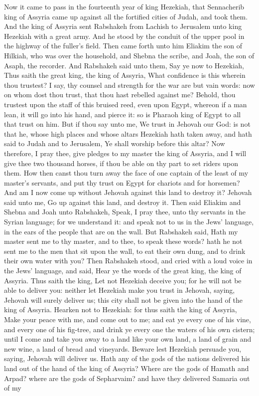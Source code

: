 Now it came to pass in the fourteenth year of king Hezekiah, that Sennacherib king of Assyria came up against all the fortified cities of Judah, and took them. And the king of Assyria sent Rabshakeh from Lachish to Jerusalem unto king Hezekiah with a great army. And he stood by the conduit of the upper pool in the highway of the fuller’s field. Then came forth unto him Eliakim the son of Hilkiah, who was over the household, and Shebna the scribe, and Joah, the son of Asaph, the recorder.  And Rabshakeh said unto them, Say ye now to Hezekiah, Thus saith the great king, the king of Assyria, What confidence is this wherein thou trustest? I say, thy counsel and strength for the war are but vain words: now on whom dost thou trust, that thou hast rebelled against me? Behold, thou trustest upon the staff of this bruised reed, even upon Egypt, whereon if a man lean, it will go into his hand, and pierce it: so is Pharaoh king of Egypt to all that trust on him. But if thou say unto me, We trust in Jehovah our God: is not that he, whose high places and whose altars Hezekiah hath taken away, and hath said to Judah and to Jerusalem, Ye shall worship before this altar? Now therefore, I pray thee, give pledges to my master the king of Assyria, and I will give thee two thousand horses, if thou be able on thy part to set riders upon them. How then canst thou turn away the face of one captain of the least of my master’s servants, and put thy trust on Egypt for chariots and for horsemen? And am I now come up without Jehovah against this land to destroy it? Jehovah said unto me, Go up against this land, and destroy it.  Then said Eliakim and Shebna and Joah unto Rabshakeh, Speak, I pray thee, unto thy servants in the Syrian language; for we understand it: and speak not to us in the Jews’ language, in the ears of the people that are on the wall. But Rabshakeh said, Hath my master sent me to thy master, and to thee, to speak these words? hath he not sent me to the men that sit upon the wall, to eat their own dung, and to drink their own water with you?  Then Rabshakeh stood, and cried with a loud voice in the Jews’ language, and said, Hear ye the words of the great king, the king of Assyria. Thus saith the king, Let not Hezekiah deceive you; for he will not be able to deliver you: neither let Hezekiah make you trust in Jehovah, saying, Jehovah will surely deliver us; this city shall not be given into the hand of the king of Assyria. Hearken not to Hezekiah: for thus saith the king of Assyria, Make your peace with me, and come out to me; and eat ye every one of his vine, and every one of his fig-tree, and drink ye every one the waters of his own cistern; until I come and take you away to a land like your own land, a land of grain and new wine, a land of bread and vineyards. Beware lest Hezekiah persuade you, saying, Jehovah will deliver us. Hath any of the gods of the nations delivered his land out of the hand of the king of Assyria? Where are the gods of Hamath and Arpad? where are the gods of Sepharvaim? and have they delivered Samaria out of my 